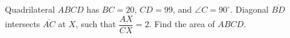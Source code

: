 Quadrilateral $ABCD$ has $BC = 20$, $CD = 99$, and $\angle C = 90^\circ$. Diagonal $\overline{BD}$ intersects $\overline{AC}$ at $X$, such that $\dfrac{AX}{CX} = 2$. Find the area of $ABCD$.
